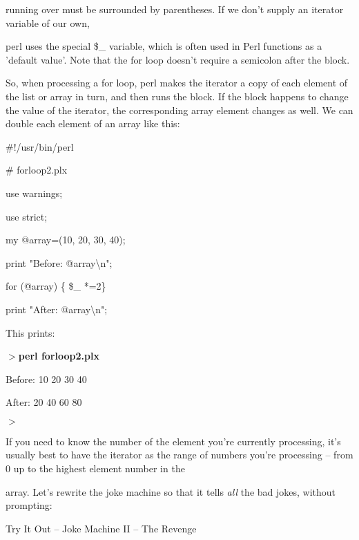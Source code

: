 \documentclass[a4paper,11pt]{book}
\begin{document}
\noindent running over must be surrounded by parentheses. If we don't supply an iterator variable of our own,

\noindent perl uses the special \$\_ variable, which is often used in Perl functions as a 'default value'. Note that the for loop doesn't require a semicolon after the block.

\noindent 

\noindent So, when processing a for loop, perl makes the iterator a copy of each element of the list or array in turn, and then runs the block. If the block happens to change the value of the iterator, the corresponding array element changes as well. We can double each element of an array like this:

\noindent 

\noindent \#!/usr/bin/perl

\noindent \# forloop2.plx

\noindent use warnings;

\noindent use strict;

\noindent 

\noindent my @array=(10, 20, 30, 40);

\noindent print "Before: @array\textbackslash n";

\noindent for (@array) \{ \$\_  *=2\} 

\noindent print "After: @array\textbackslash n";

\noindent 

\noindent This prints:

\noindent 

\noindent $>$\textbf{perl forloop2.plx}

\noindent Before: 10 20 30 40

\noindent After: 20 40 60 80

\noindent $>$

\noindent 

\noindent If you need to know the number of the element you're currently processing, it's usually best to have the iterator as the range of numbers you're processing -- from 0 up to the highest element number in the

\noindent array. Let's rewrite the joke machine so that it tells \textit{all }the bad jokes, without prompting:

\noindent 

\noindent Try It Out -- Joke Machine II -- The Revenge

\noindent 

\noindent 
\end{document}
